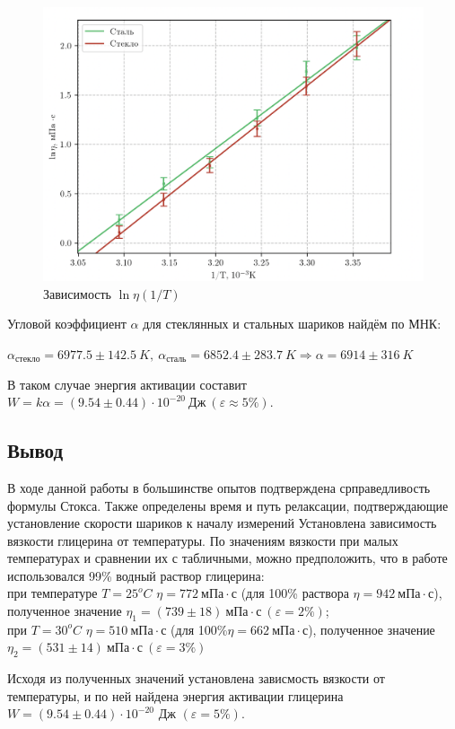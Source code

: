 \documentclass[12pt,a4paper]{article}
\begin{document}
\begin{figure}[htp]
    \centering
    \includegraphics[scale=0.73]{ln_n_1_T2.png}
    \caption{Зависимость $\ln \eta (1/T)$}
\end{figure}

Угловой коэффициент $\alpha$ для стеклянных и стальных шариков найдём по МНК: 

$\alpha_{стекло} = 6977.5\pm 142.5\ K,\ \alpha_{сталь} = 6852.4\pm283.7\ K \Rightarrow \alpha = 6914\pm 316\ K$

В таком случае энергия активации составит $W = k\alpha = (9.54 \pm 0.44) \cdot 10^{-20}\ Дж\ (\varepsilon \approx 5\%)$. 

\subsection*{Вывод}
В ходе данной работы в большинстве опытов подтверждена срправедливость формулы Стокса. 
Также определены время и путь релаксации, подтверждающие установление скорости шариков к началу измерений
Установлена зависимость вязкости глицерина от температуры. По значениям вязкости при малых температурах и сравнении их с табличными, можно предположить, что в работе использовался 99\% водный раствор глицерина:\\
при температуре $T = 25^oC$ $\eta = 772\ мПа\cdot с$ (для 100\% раствора $\eta = 942\ мПа\cdot с$), полученное значение $\eta_1 = (739\pm 18)\ мПа \cdot с\ (\varepsilon = 2\%)$; \\
при $T = 30^oC$ $\eta = 510\ мПа\cdot с$ (для 100\%$\eta = 662\ мПа\cdot с$), полученное значение $\eta_2 = (531\pm 14)\ мПа \cdot с\ (\varepsilon = 3\%)$

Исходя из полученных значений установлена зависмость вязкости от температуры, и по ней найдена энергия активации глицерина $W = (9.54\pm 0.44)\cdot 10^{-20}$ Дж $(\varepsilon = 5\%)$.
\end{document}
